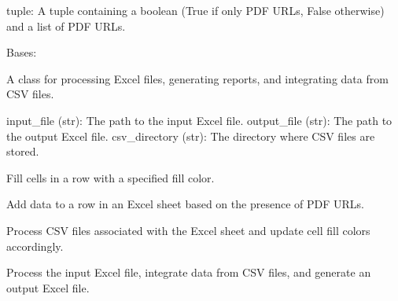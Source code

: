 \documentclass[letterpaper,10pt,english]{sphinxmanual}
\begin{document}
\begin{fulllineitems}
\begin{fulllineitems}
\begin{description}
\sphinxAtStartPar
tuple: A tuple containing a boolean (True if only PDF URLs, False otherwise) and a list of PDF URLs.

\end{description}

\end{fulllineitems}


\end{fulllineitems}


\begin{fulllineitems}
\label{\detokenize{postprocess:postprocess.ExcelProcessor}}
\pysigstartsignatures
{}
\pysigstopsignatures
\sphinxAtStartPar
Bases: 

\sphinxAtStartPar
A class for processing Excel files, generating reports, and integrating data from CSV files.
\begin{description}
\sphinxAtStartPar
input\_file (str): The path to the input Excel file.
output\_file (str): The path to the output Excel file.
csv\_directory (str): The directory where CSV files are stored.

\begin{description}
\sphinxAtStartPar
Fill cells in a row with a specified fill color.

\sphinxAtStartPar
Add data to a row in an Excel sheet based on the presence of PDF URLs.

\sphinxAtStartPar
Process CSV files associated with the Excel sheet and update cell fill colors accordingly.

\sphinxAtStartPar
Process the input Excel file, integrate data from CSV files, and generate an output Excel file.

\end{description}


\end{description}
\end{fulllineitems}
\end{document}
